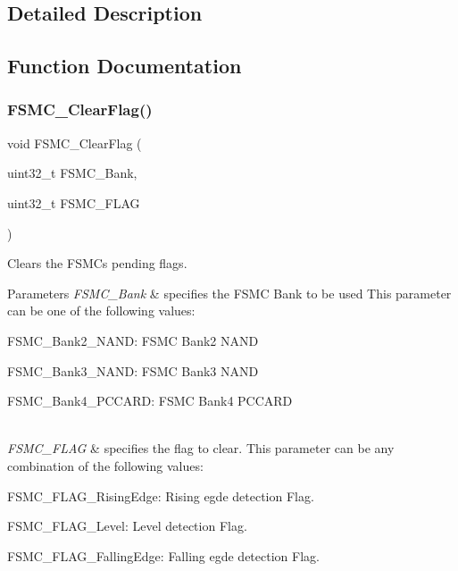 \subsection{Detailed Description}


\subsection{Function Documentation}
\mbox{\label{group___f_s_m_c___exported___functions_ga697618f2de0ad9a8a82461ddbebd5264}} 
\subsubsection{\texorpdfstring{FSMC\_ClearFlag()}{FSMC\_ClearFlag()}}
{\footnotesize\ttfamily void F\+S\+M\+C\+\_\+\+Clear\+Flag (\begin{DoxyParamCaption}\item[{uint32\+\_\+t}]{F\+S\+M\+C\+\_\+\+Bank,  }\item[{uint32\+\_\+t}]{F\+S\+M\+C\+\_\+\+F\+L\+AG }\end{DoxyParamCaption})}



Clears the F\+S\+MC\textquotesingle{}s pending flags. 


\begin{DoxyParams}{Parameters}
{\em F\+S\+M\+C\+\_\+\+Bank} & specifies the F\+S\+MC Bank to be used This parameter can be one of the following values\+: \begin{DoxyItemize}
\item F\+S\+M\+C\+\_\+\+Bank2\+\_\+\+N\+A\+ND\+: F\+S\+MC Bank2 N\+A\+ND \item F\+S\+M\+C\+\_\+\+Bank3\+\_\+\+N\+A\+ND\+: F\+S\+MC Bank3 N\+A\+ND \item F\+S\+M\+C\+\_\+\+Bank4\+\_\+\+P\+C\+C\+A\+RD\+: F\+S\+MC Bank4 P\+C\+C\+A\+RD \end{DoxyItemize}
\\
\hline
{\em F\+S\+M\+C\+\_\+\+F\+L\+AG} & specifies the flag to clear. This parameter can be any combination of the following values\+: \begin{DoxyItemize}
\item F\+S\+M\+C\+\_\+\+F\+L\+A\+G\+\_\+\+Rising\+Edge\+: Rising egde detection Flag. \item F\+S\+M\+C\+\_\+\+F\+L\+A\+G\+\_\+\+Level\+: Level detection Flag. \item F\+S\+M\+C\+\_\+\+F\+L\+A\+G\+\_\+\+Falling\+Edge\+: Falling egde detection Flag. \end{DoxyItemize}
\\
\hline
\end{DoxyParams}

